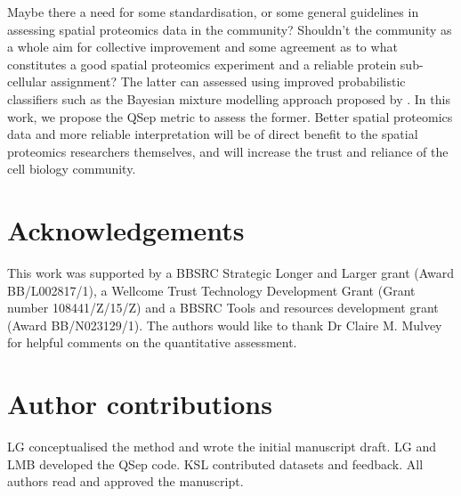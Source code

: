 \documentclass[12pt]{article}\usepackage[]{graphicx}\usepackage[]{color}
\begin{document}
Maybe there a need for some standardisation, or some general
guidelines in assessing spatial proteomics data in the community?
Shouldn't the community as a whole aim for collective improvement and
some agreement as to what constitutes a good spatial proteomics
experiment and a reliable protein sub-cellular assignment? The latter
can assessed using improved probabilistic classifiers such as the
Bayesian mixture modelling approach proposed by \citet{Crook:2018}. In
this work, we propose the QSep metric to assess the former. Better
spatial proteomics data and more reliable interpretation will be of
direct benefit to the spatial proteomics researchers themselves, and
will increase the trust and reliance of the cell biology community.

\section*{Acknowledgements}

This work was supported by a BBSRC Strategic Longer and Larger grant
(Award BB/L002817/1), a Wellcome Trust Technology Development Grant
(Grant number 108441/Z/15/Z) and a BBSRC Tools and resources
development grant (Award BB/N023129/1). The authors would like to
thank Dr Claire M. Mulvey for helpful comments on the quantitative
assessment.

\section*{Author contributions}

LG conceptualised the method and wrote the initial manuscript
draft. LG and LMB developed the QSep code. KSL contributed datasets
and feedback. All authors read and approved the manuscript.

\newpage
\end{document}
